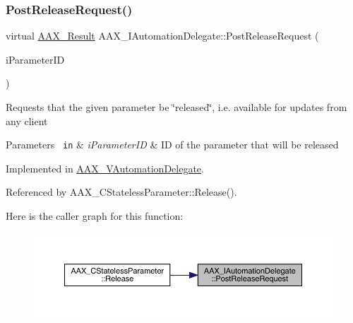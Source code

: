 \subsubsection{\texorpdfstring{PostReleaseRequest()}{PostReleaseRequest()}}
{\footnotesize\ttfamily virtual \mbox{\hyperlink{a00392_a4d8f69a697df7f70c3a8e9b8ee130d2f}{A\+A\+X\+\_\+\+Result}} A\+A\+X\+\_\+\+I\+Automation\+Delegate\+::\+Post\+Release\+Request (\begin{DoxyParamCaption}\item[{\mbox{\hyperlink{a00392_a1440c756fe5cb158b78193b2fc1780d1}{A\+A\+X\+\_\+\+C\+Param\+ID}}}]{i\+Parameter\+ID }\end{DoxyParamCaption})\hspace{0.3cm}{\ttfamily [pure virtual]}}

Requests that the given parameter be \char`\"{}released\char`\"{}, i.\+e. available for updates from any client


\begin{DoxyParams}[1]{Parameters}
\mbox{\texttt{ in}}  & {\em i\+Parameter\+ID} & ID of the parameter that will be released \\
\hline
\end{DoxyParams}


Implemented in \mbox{\hyperlink{a01893_a2808e1e38836349f6e51d72e0219cfe4}{A\+A\+X\+\_\+\+V\+Automation\+Delegate}}.



Referenced by A\+A\+X\+\_\+\+C\+Stateless\+Parameter\+::\+Release().

Here is the caller graph for this function\+:
\nopagebreak
\begin{figure}[H]
\begin{center}
\leavevmode
\includegraphics[width=350pt]{a01773_a89049fae2c35a4b99cfeb6585898bb69_icgraph}
\end{center}
\end{figure}
\mbox{\label{a01773_a4436f06c72d61217cbbfc7c233501f29}} 
